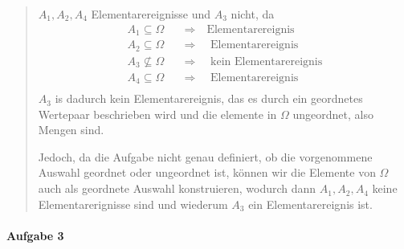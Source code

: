 \documentclass[
]{article}
\begin{document}
\begin{quote}
\(A_1, A_{2}, A_{4}\) Elementarereignisse und \(A_3\) nicht, da
\[\begin{align}
A_{1} \subseteq \Omega \quad &\Longrightarrow \quad \text{Elementarereignis} \\
A_{2} \subseteq \Omega \quad &\Longrightarrow \quad \text{ Elementarereignis} \\
A_{3} \not\subseteq \Omega \quad &\Longrightarrow \quad \text{ kein Elementarereignis} \\
A_{4} \subseteq \Omega \quad &\Longrightarrow \quad \text{ Elementarereignis} \\
\end{align}\] \(A_{3}\) is dadurch kein Elementarereignis, das es durch
ein geordnetes Wertepaar beschrieben wird und die elemente in \(\Omega\)
ungeordnet, also Mengen sind.

Jedoch, da die Aufgabe nicht genau definiert, ob die vorgenommene
Auswahl geordnet oder ungeordnet ist, können wir die Elemente von
\(\Omega\) auch als geordnete Auswahl konstruieren, wodurch dann
\(A_1, A_{2}, A_{4}\) keine Elementarerignisse sind und wiederum \(A_3\)
ein Elementarereignis ist.
\end{quote}

\paragraph{Aufgabe 3}\label{aufgabe-3}
\end{document}
